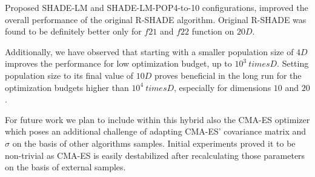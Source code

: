 \documentclass[sigconf]{acmart}
\begin{document}
Proposed SHADE-LM and SHADE-LM-POP4-to-10 configurations,
improved the overall performance of the original R-SHADE algorithm.
Original R-SHADE was found to be definitely better only for $f21$
and $f22$ function on $20D$.

Additionally, we have observed that starting with a smaller population size
of $4D$ improves the performance for low optimization budget,
up to $10^3 \ times D$. Setting population size to its final value
of $10D$ proves beneficial in the long run for the optimization
budgets higher than $10^4 \ times D$, especially for dimensions $10$
and $20$.

For future work we plan to include within this hybrid also the CMA-ES
optimizer which poses an additional challenge of adapting CMA-ES' covariance
matrix and $\sigma$ on the basis of other algorithms samples.
Initial experiments proved it to be non-trivial as CMA-ES is easily destabilized
after recalculating those parameters on the basis of external samples.


\end{document}
